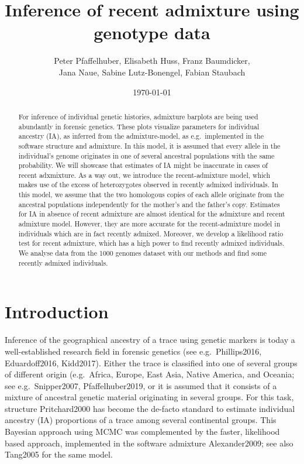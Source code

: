 \documentclass[12pt]{article}
\theoremstyle{definition}
\begin{document}
\title{\LARGE Inference of recent admixture using genotype data}

\author{\sc Peter Pfaffelhuber, Elisabeth Huss, Franz Baumdicker, \\
  \sc Jana Naue, Sabine Lutz-Bonengel, Fabian Staubach}

\date{\today}

\maketitle

\begin{abstract}
  \noindent
  For inference of individual genetic histories, admixture barplots
  are being used abundantly in forensic genetics. These plots
  visualize parameters for individual ancestry (IA), as inferred from
  the admixture-model, as e.g.\ implemented in the software {\sc
    structure} and {\sc admixture}. In this model, it is assumed that
  every allele in the individual's genome originates in one of several
  ancestral populations with the same probability. We will showcase
  that estimates of IA might be inaccurate in cases of recent
  adxmixture. As a way out, we introduce the recent-admixture model,
  which makes use of the excess of heterozygotes observed in recently
  admixed individuals. In this model, we assume that the two
  homologous copies of each allele originate from the ancestral
  populations independently for the mother's and the father's
  copy. Estimates for IA in absence of recent admixture are almost
  identical for the admixture and recent admixture model. However,
  they are more accurate for the recent-admixture model in individuals
  which are in fact recently admixed. Moreover, we develop a
  likelihood ratio test for recent admixture, which has a high power
  to find recently admixed individuals. We analyse data from the 1000
  genomes dataset with our methods and find some recently admixed
  individuals.
\end{abstract}

\section{Introduction}
Inference of the geographical ancestry of a trace using genetic
markers is today a well-established research field in forensic
genetics (see e.g.\ \cite{article}{Phillips2016, Eduardoff2016,
  Kidd2017}). Either the trace is classified into one of several
groups of different origin (e.g.\ Africa, Europe, East Asia, Native
America, and Oceania; see e.g.\ \cite{article}{Snipper2007,
  Pfaffelhuber2019}, or it is assumed that it consists of a mixture of
ancestral genetic material originating in several groups. For this
task, {\sc structure} \cite{article}{Pritchard2000} has become the
de-facto standard to estimate individual ancestry (IA) proportions of
a trace among several continental groups. This Bayesian approach using
MCMC was complemented by the faster, likelihood based approach,
implemented in the software {\sc admixture}
\cite{article}{Alexander2009}; see also \cite{article}{Tang2005} for
the same model.
\end{document}
